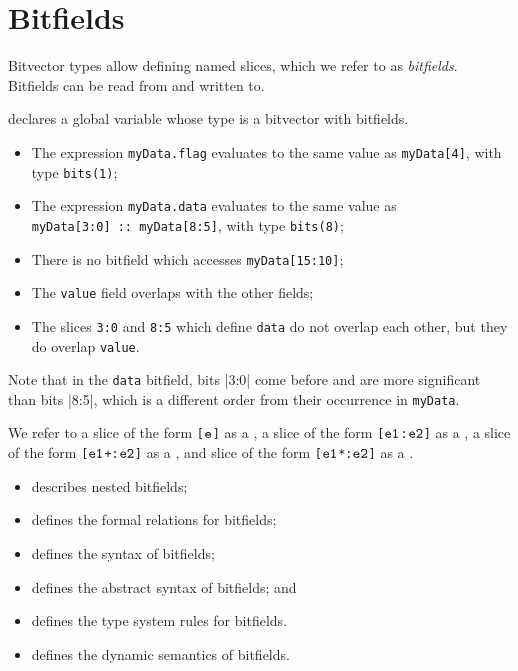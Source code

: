 \chapter{Bitfields\label{chap:Bitfields}}

\hypertarget{bitfieldterm}{}
Bitvector types allow defining named slices, which we refer to as \emph{bitfields}.
Bitfields can be read from and written to. 

 declares a global variable whose type is a bitvector with bitfields.
\begin{itemize}
  \item The expression \texttt{myData.flag} evaluates to the same value as \verb|myData[4]|, with type \verb|bits(1)|;
  \item The expression \texttt{myData.data} evaluates to the same value as \\
        \verb|myData[3:0] :: myData[8:5]|, with type \verb|bits(8)|;
  \item There is no bitfield which accesses \verb|myData[15:10]|;
  \item The \verb|value| field overlaps with the other fields;
  \item The slices \verb|3:0| and \verb|8:5| which define \texttt{data} do not overlap each other,
        but they do overlap \verb|value|.
\end{itemize}
Note that in the \texttt{data} bitfield, bits |3:0| come before and are more significant than
bits |8:5|, which is a different order from their occurrence in \texttt{myData}.

\hypertarget{def-singleslice}{}
\hypertarget{def-rangeslice}{}
\hypertarget{def-lengthslice}{}
\hypertarget{def-scaledslice}{}
We refer to a slice of the form \texttt{[$\texttt{e}$]} as a \singleslice,
a slice of the form \texttt{[$\texttt{e1}$:$\texttt{e2}$]} as a \rangeslice,
a slice of the form \texttt{[$\texttt{e1}$+:$\texttt{e2}$]} as a \lengthslice,
and slice of the form \texttt{[$\texttt{e1}$*:$\texttt{e2}$]} as a \scaledslice.

\ChapterOutline
\begin{itemize}
  \item {} describes nested bitfields;
  \item {} defines the formal relations for bitfields;
  \item {} defines the syntax of bitfields;
  \item {} defines the abstract syntax of bitfields; and
  \item {} defines the type system rules for bitfields.
  \item {} defines the dynamic semantics of bitfields.
\end{itemize}

